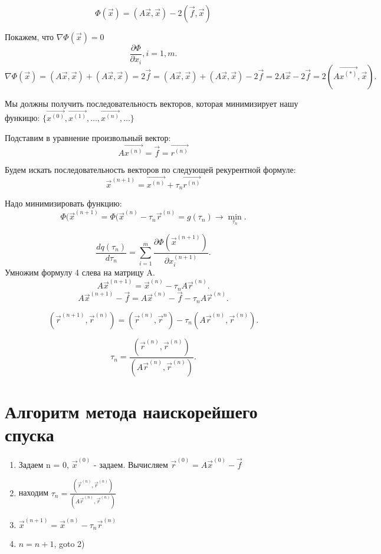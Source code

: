 \documentclass[a4paper,12pt]{article}
\begin{document}
\begin{equation}
    \Phi ( \vec{x} ) = (A \vec{x}, \vec{x}) - 2 ( \vec{f}, \vec{x} )
\end{equation}

Покажем, что $\nabla \Phi ( \vec{x}) = 0$ 
\[
 \frac{\partial \Phi}{\partial x_{i}}, i = 1,m 
.\] 
\[
    \nabla \Phi ( \vec{x} ) = (A \vec{x}, \vec{x}) + (A \vec{x}, \vec{x}) = 2 \vec{f} =
    (A \vec{x}, \vec{x}) + (A \vec{x}, \vec{x}) - 2 \vec{f} = 2 A \vec{x} - 2 \vec{f} = 
    2 (A \vec{x^{(*)}}, \vec{x})
.\] 

Мы должны получить последовательность векторов, которая минимизирует нашу функицю: $\{ \vec{x^{(0)}},
\vec{x^{(1)}}, \ldots, \vec{x^{(n)}}, \ldots\}$

Подставим в уравнение произвольный вектор:
\begin{equation}
    A \vec{x^{(n)}} = \vec{f} = \vec{r^{(n)}}
\end{equation}

Будем искать последовательность векторов по следующей рекурентной формуле:
\begin{equation}
    \vec{x}^{(n + 1)} = \vec{x^{(n)}} + \tau_{n} \vec{r^{(n)}}
\end{equation}

Надо минимизировать функцию:
\[
    \Phi ( \vec{x}^{(n + 1)} = \Phi ( \vec{x}^{(n)} - \tau_{n} \vec{r}^{(n)} = 
    g( \tau_{n} ) \to \min_{ \tau_{n} }  
.\] 

\[
    \frac{d q ( \tau_{n} )}{d \tau_{n}} = \sum_{i = 1}^{m} \frac{\partial
    \Phi ( \vec{x}^{(n + 1)} )}{\partial x_{i}^{(n + 1)}}
.\] 
Умножим формулу 4 слева на матрицу A.
\[
    A \vec{x}^{(n + 1)} = \vec{x}^{(n)} - \tau_{n} A \vec{r}^{(n)}
.\] 
\[
    A \vec{x}^{(n + 1)} - \vec{f} = A \vec{x}^{(n)} - \vec{f} - \tau_{n} A \vec{r}^{(n)}
.\] 

\[
    ( \vec{r}^{(n + 1)}, \vec{r}^{(n)} ) = ( \vec{r}^{(n)}, \vec{r}^{n} ) - \tau_{n}
    (A \vec{r}^{(n)}, \vec{r}^{(n)} )
.\] 

\[
    \tau_{n} = \frac{( \vec{r}^{(n)}, \vec{r}^{(n)} )}{(A \vec{r}^{(n)}, \vec{r}^{(n)})}
.\] 

\section{Алгоритм метода наискорейшего спуска}%
\label{sec:алгоритм_метода_наискорейшего_спуска}

\begin{enumerate}
    \item Задаем n = 0, $ \vec{x}^{(0)}$ - задаем. Вычисляем 
        $ \vec{r}^{(0)} = A \vec{x}^{(0)} - \vec{f}$ 
    \item находим $\tau_{n} = \frac{ (\vec{r}^{(n)} , \vec{r}^{(n)} )}{(A \vec{r}^{(n)}, \vec{r}^{(n)})}$ 
    \item $ \vec{x}^{(n + 1)} = \vec{x}^{(n)} - \tau_{n} \vec{r}^{(n)}$ 
    \item $n = n + 1$, goto 2)
\end{enumerate}
\end{document}
